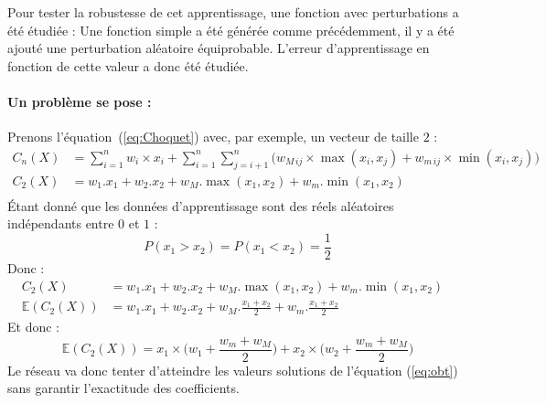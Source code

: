 Pour tester la robustesse de cet apprentissage, une fonction avec perturbations a été étudiée :
Une fonction simple a été générée comme précédemment, il y a été ajouté une perturbation aléatoire équiprobable.
L’erreur d’apprentissage en fonction de cette valeur a donc été étudiée.\\


\paragraph{Un problème se pose :}
Prenons l'équation\ (\ref{eq:Choquet}) avec, par exemple, un vecteur de taille $2$ :
\begin{align*}
    C_n (X)
    & =
        \sum_{i=1}^{n}
                w_i \times x_i +
            \sum_{i=1}^{n}\sum_{j=i+1}^{n}
            \Big(
                w_{M\,ij} \times \max(x_i,x_j) + w_{m\,ij} \times \min(x_i,x_j)
            \Big)
    &\\
    C_2 (X)
    & =
        w_1.x_1 + w_2.x_2 + w_M.\max(x_1,x_2) + w_m.\min(x_1,x_2)
    &\\
\end{align*}
Étant donné que les données d'apprentissage sont des réels aléatoires indépendants entre $0$ et $1$ :
\begin{equation}
    \label{eq:proba}
    P(x_1 > x_2) = P(x_1 < x_2) = \frac{1}{2}
\end{equation}
Donc :
\begin{align*}
    C_2 (X)
    & =
        w_1.x_1 + w_2.x_2 + w_M.\max(x_1,x_2) + w_m.\min(x_1,x_2)
    &\\
    \mathbb{E}(C_2 (X))
    & =
        w_1.x_1 + w_2.x_2 + w_M.\frac{x_1 + x_2}{2} + w_m.\frac{x_1 + x_2}{2}
    &
\end{align*}
Et donc :
\begin{equation}
    \label{eq:obt}
    \mathbb{E}(C_2 (X)) =
        x_1 \times \Big(w_1 + \frac{w_m + w_M}{2}\Big) + x_2 \times \Big(w_2 + \frac{w_m + w_M}{2}\Big)
\end{equation}
Le réseau va donc tenter d'atteindre les valeurs solutions de l'équation
(\ref{eq:obt}) sans garantir l'exactitude des coefficients.

